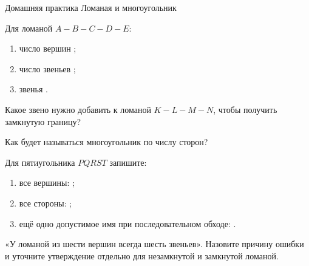 \worksheettitle
  {Домашняя практика}
  { Ломаная и многоугольник}

\studentnameblock

\begin{practicebox}[1. Ломаная]
  Для ломаной $A-B-C-D-E$:
  \begin{enumerate}[label=\alph*)]
    \item число вершин \answerblank[15mm];
    \item число звеньев \answerblank[15mm];
    \item звенья \answerblank[85mm].
  \end{enumerate}
\end{practicebox}

\begin{practicebox}
  Какое звено нужно добавить к ломаной $K-L-M-N$, чтобы получить замкнутую
  границу? \answerblank[25mm]

  Как будет называться многоугольник по числу сторон? \answerblank[38mm]
\end{practicebox}

\begin{practicebox}
  Для пятиугольника $PQRST$ запишите:
  \begin{enumerate}[label=\alph*)]
    \item все вершины: \answerblank[80mm];
    \item все стороны: \answerblank[90mm];
    \item ещё одно допустимое имя при последовательном обходе:
      \answerblank[35mm].
  \end{enumerate}
\end{practicebox}

\begin{warningbox}
  «У ломаной из шести вершин всегда шесть звеньев».
  Назовите причину ошибки и уточните утверждение отдельно для незамкнутой
  и замкнутой ломаной. 
\end{warningbox}
